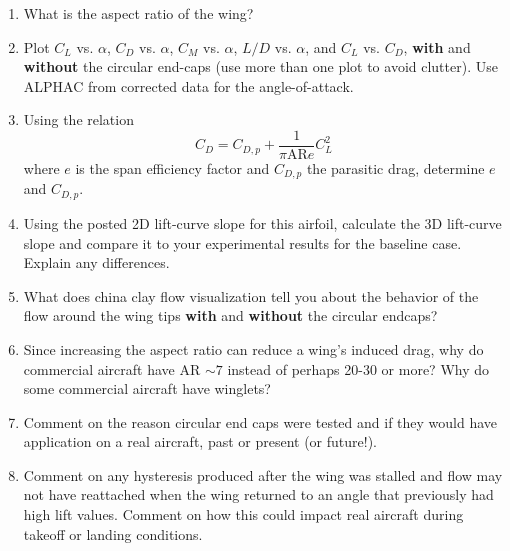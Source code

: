 \documentclass[12pt]{article}
\begin{document}
\begin{enumerate}[noitemsep]
\item What is the aspect ratio of the wing?
\item Plot $C_L$ vs. $\alpha$, $C_D$ vs. $\alpha$, $C_M$ vs. $\alpha$, $L/D$ vs. $\alpha$, and $C_L$ vs. $C_D$, \textbf{with} and \textbf{without} the circular end-caps (use more than one plot to avoid clutter). Use ALPHAC from corrected data for the angle-of-attack.
\item Using the relation
  \begin{equation}
    C_D = C_{D,p} + \frac{1}{\pi\text{AR} e}C_L^2
  \end{equation}
  where $e$ is the span efficiency factor and $C_{D,p}$ the parasitic drag, determine $e$ and $C_{D,p}$.
\item Using the posted 2D lift-curve slope for this airfoil, calculate the 3D lift-curve slope and compare it to your experimental results for the baseline case. Explain any differences.
\item What does china clay flow visualization tell you about the behavior of the flow around the wing tips \textbf{with} and \textbf{without} the circular endcaps?
\item Since increasing the aspect ratio can reduce a wing's induced drag, why do commercial aircraft have AR $\sim 7$ instead of perhaps 20-30 or more? Why do some commercial aircraft have winglets?
\item Comment on the reason circular end caps were tested and if they would have application on a real aircraft, past or present (or future!).
\item Comment on any hysteresis produced after the wing was stalled and flow may not have reattached when the wing returned to an angle that previously had high lift values. Comment on how this could impact real aircraft during takeoff or landing conditions.
\end{enumerate}
% 
\end{document}
